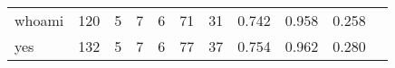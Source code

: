 \begin{longtable}{lp{1.10cm}p{1.10cm}p{1.10cm}p{1.10cm}p{1.10cm}p{1.10cm}p{1.10cm}p{1.10cm}p{1.10cm}p{1.10cm}}
whoami    &                    120 &                                  5 &                                 7 &                                6 &                                71 &                              31 &                             0.742 &                                 0.958 &                               0.258 \\
yes       &                    132 &                                  5 &                                 7 &                                6 &                                77 &                              37 &                             0.754 &                                 0.962 &                               0.280 \\
\end{longtable}
